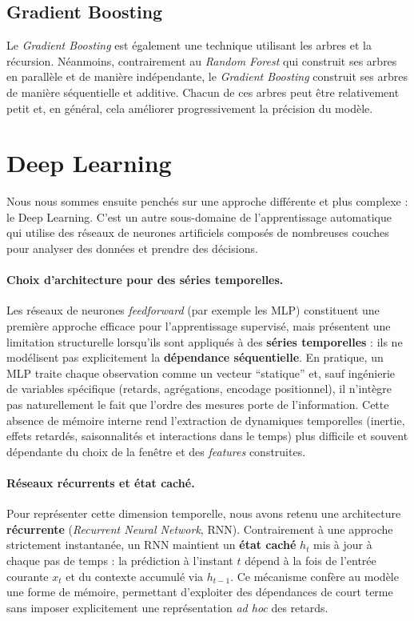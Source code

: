 \documentclass{article}
\theoremstyle{nopointbreak}
\theoremstyle{nobrkbold}
\begin{document}
\subsection{Gradient Boosting}
Le \textit{Gradient Boosting }est également une technique utilisant les arbres et la récursion. Néanmoins, contrairement au \textit{Random Forest} qui construit ses arbres en parallèle et de manière indépendante, le \textit{Gradient Boosting} construit ses arbres de manière séquentielle et additive. Chacun de ces arbres peut être relativement petit et, en général, cela améliorer progressivement la précision du modèle. 


\section{Deep Learning}

Nous nous sommes ensuite penchés sur une approche différente et plus complexe : le Deep Learning. C'est un autre sous-domaine de l'apprentissage automatique qui utilise des réseaux de neurones artificiels composés de nombreuses couches pour analyser des données et prendre des décisions. 

\paragraph{Choix d'architecture pour des séries temporelles.}
Les réseaux de neurones \emph{feedforward} (par exemple les MLP) constituent une première approche efficace pour l'apprentissage supervisé, mais présentent une limitation structurelle lorsqu'ils sont appliqués à des \textbf{séries temporelles} : ils ne modélisent pas explicitement la \textbf{dépendance séquentielle}. En pratique, un MLP traite chaque observation comme un vecteur ``statique'' et, sauf ingénierie de variables spécifique (retards, agrégations, encodage positionnel), il n'intègre pas naturellement le fait que l'ordre des mesures porte de l'information. Cette absence de mémoire interne rend l'extraction de dynamiques temporelles (inertie, effets retardés, saisonnalités et interactions dans le temps) plus difficile et souvent dépendante du choix de la fenêtre et des \emph{features} construites.

\paragraph{Réseaux récurrents et état caché.}
Pour représenter cette dimension temporelle, nous avons retenu une architecture \textbf{récurrente} (\emph{Recurrent Neural Network}, RNN). Contrairement à une approche strictement instantanée, un RNN maintient un \textbf{état caché} $h_t$ mis à jour à chaque pas de temps : la prédiction à l'instant $t$ dépend à la fois de l'entrée courante $x_t$ et du contexte accumulé via $h_{t-1}$. Ce mécanisme confère au modèle une forme de mémoire, permettant d'exploiter des dépendances de court terme sans imposer explicitement une représentation \emph{ad hoc} des retards.
\end{document}
